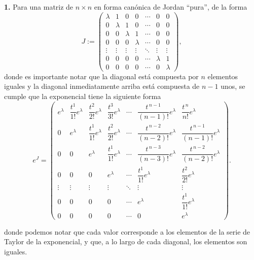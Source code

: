 \documentclass[
  11pt,
  letterpaper,
   addpoints,
   answers
  ]{exam}
\begin{document}
\begin{questions}
\begin{solution}
\medskip
\noindent\textbf{1.} Para una matriz de $n\times n$ en forma canónica de Jordan ``pura'', de la forma
\begin{equation}
J:=\begin{pmatrix}
\lambda & 1 & 0 & 0 & \cdots & 0 & 0\\
0 & \lambda & 1 & 0 & \cdots & 0 & 0\\
0 & 0 & \lambda & 1 & \cdots & 0 & 0\\
0 & 0 & 0 & \lambda & \cdots & 0 & 0\\
\vdots & \vdots & \vdots & \vdots & \ddots & \vdots & \vdots\\
0 & 0 & 0 & 0 & \cdots & \lambda & 1\\
0 & 0 & 0 & 0 & \cdots & 0 & \lambda
\end{pmatrix},
\end{equation}
donde es importante notar que la diagonal está compuesta por $n$ elementos iguales y la diagonal inmediatamente arriba está compuesta de $n-1$ unos, se cumple que la exponencial tiene la siguiente forma
\begin{equation}
e^{J}=
\begin{pmatrix}
e^{\lambda} & \dfrac{t^{1}}{1!}e^{\lambda} & \dfrac{t^{2}}{2!}e^{\lambda} & \dfrac{t^{3}}{3!}e^{\lambda} & \cdots & \dfrac{t^{\,n-1}}{(n-1)!}e^{\lambda} & \dfrac{t^{\,n}}{n!}e^{\lambda}\\
0 & e^{\lambda} & \dfrac{t^{1}}{1!}e^{\lambda} & \dfrac{t^{2}}{2!}e^{\lambda} & \cdots & \dfrac{t^{\,n-2}}{(n-2)!}e^{\lambda} & \dfrac{t^{\,n-1}}{(n-1)!}e^{\lambda}\\
0 & 0 & e^{\lambda} & \dfrac{t^{1}}{1!}e^{\lambda} & \cdots & \dfrac{t^{\,n-3}}{(n-3)!}e^{\lambda} & \dfrac{t^{\,n-2}}{(n-2)!}e^{\lambda}\\
0 & 0 & 0 & e^{\lambda} & \cdots & \dfrac{t^{1}}{1!}e^{\lambda} & \dfrac{t^{2}}{2!}e^{\lambda}\\
\vdots & \vdots & \vdots & \vdots & \ddots & \vdots & \vdots\\
0 & 0 & 0 & 0 & \cdots & e^{\lambda} & \dfrac{t^{1}}{1!}e^{\lambda}\\
0 & 0 & 0 & 0 & \cdots & 0 & e^{\lambda}
\end{pmatrix}.
\end{equation}

donde podemos notar que cada valor corresponde a los elementos de la serie de Taylor de la exponencial, y que, a lo largo de cada diagonal, los elementos son iguales.


\end{solution}
\end{questions}
\end{document}
